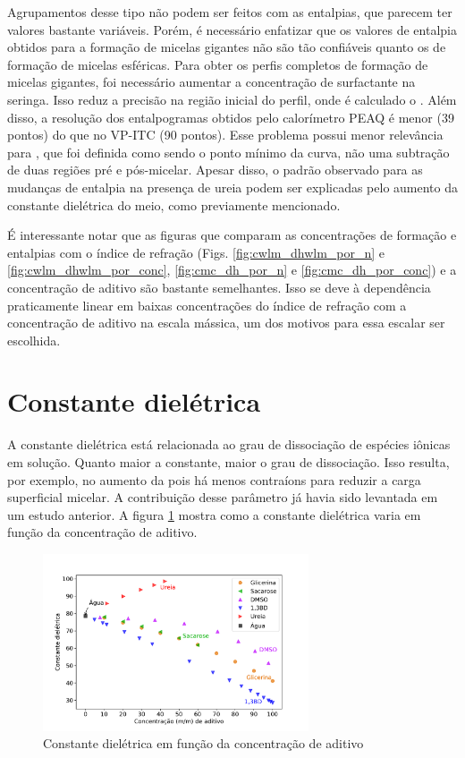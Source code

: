 		Agrupamentos desse tipo não podem ser feitos com as entalpias, que parecem ter valores bastante variáveis. Porém, é necessário enfatizar que os valores de entalpia obtidos para a formação de micelas gigantes não são tão confiáveis quanto os de formação de micelas esféricas. Para obter os perfis completos de formação de micelas gigantes, foi necessário aumentar a concentração de surfactante na seringa. Isso reduz a precisão na região inicial do perfil, onde é calculado o \DHwlm. Além disso, a resolução dos entalpogramas obtidos pelo calorímetro PEAQ é menor (39 pontos) do que no VP-ITC (90 pontos). Esse problema possui menor relevância para \cwlm{}, que foi definida como sendo o ponto mínimo da curva, não uma subtração de duas regiões pré e pós-micelar.  Apesar disso, o padrão observado para as mudanças de entalpia na presença de ureia podem ser explicadas pelo aumento da constante dielétrica do meio, como previamente mencionado.
	
		É interessante notar que as figuras que comparam as concentrações de formação e entalpias com o índice de refração (Figs. \ref{fig:cwlm_dhwlm_por_n} e \ref{fig:cwlm_dhwlm_por_conc}, \ref{fig:cmc_dh_por_n} e \ref{fig:cmc_dh_por_conc}) e a concentração de aditivo são bastante semelhantes. Isso se deve à dependência praticamente linear em baixas concentrações do índice de refração com a concentração de aditivo na escala mássica, um dos motivos para essa escalar ser escolhida.
		
		\FloatBarrier
		
		\section{Constante dielétrica}
		
		A constante dielétrica está relacionada ao grau de dissociação de espécies iônicas em solução. Quanto maior a constante, maior o grau de dissociação. Isso resulta, por exemplo, no aumento da \cmc{} pois há menos contraíons para reduzir a carga superficial micelar. A contribuição desse parâmetro já havia sido levantada em um estudo anterior. %
		A figura \ref{fig:cte_dieletrica} mostra como a constante dielétrica varia em função da concentração de aditivo. %

		
		\begin{figure}[h]
			\centering
			\includegraphics[width=0.7\textwidth]{imagens/propriedades/cte_dieletrica}
			\caption{Constante dielétrica em função da concentração de aditivo}  %
			\label{fig:cte_dieletrica}
		\end{figure}
	
